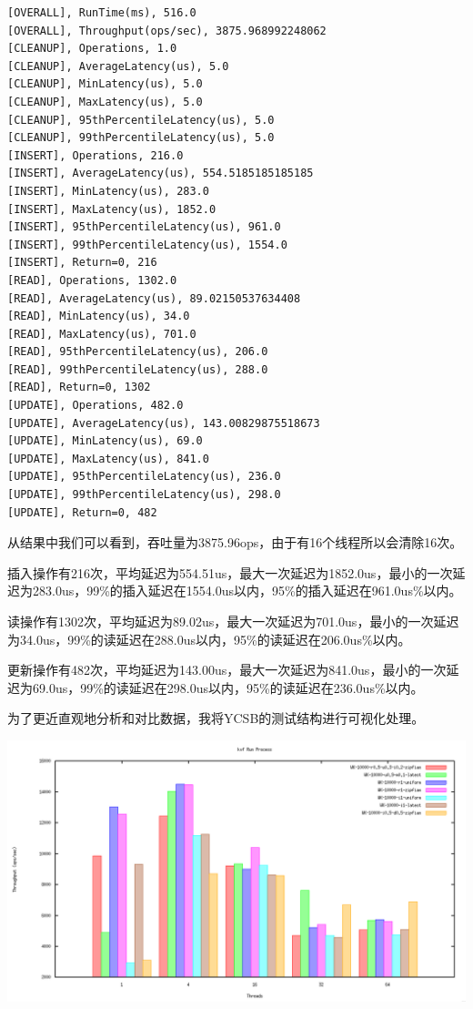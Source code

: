 \begin{Verbatim}[frame = single]
[OVERALL], RunTime(ms), 516.0
[OVERALL], Throughput(ops/sec), 3875.968992248062
[CLEANUP], Operations, 1.0
[CLEANUP], AverageLatency(us), 5.0
[CLEANUP], MinLatency(us), 5.0
[CLEANUP], MaxLatency(us), 5.0
[CLEANUP], 95thPercentileLatency(us), 5.0
[CLEANUP], 99thPercentileLatency(us), 5.0
[INSERT], Operations, 216.0
[INSERT], AverageLatency(us), 554.5185185185185
[INSERT], MinLatency(us), 283.0
[INSERT], MaxLatency(us), 1852.0
[INSERT], 95thPercentileLatency(us), 961.0
[INSERT], 99thPercentileLatency(us), 1554.0
[INSERT], Return=0, 216
[READ], Operations, 1302.0
[READ], AverageLatency(us), 89.02150537634408
[READ], MinLatency(us), 34.0
[READ], MaxLatency(us), 701.0
[READ], 95thPercentileLatency(us), 206.0
[READ], 99thPercentileLatency(us), 288.0
[READ], Return=0, 1302
[UPDATE], Operations, 482.0
[UPDATE], AverageLatency(us), 143.00829875518673
[UPDATE], MinLatency(us), 69.0
[UPDATE], MaxLatency(us), 841.0
[UPDATE], 95thPercentileLatency(us), 236.0
[UPDATE], 99thPercentileLatency(us), 298.0
[UPDATE], Return=0, 482
\end{Verbatim}

	从结果中我们可以看到，吞吐量为3875.96op\/s，由于有16个线程所以会清除16次。

	插入操作有216次，平均延迟为554.51us，最大一次延迟为1852.0us，最小的一次延迟为283.0us，99\%的插入延迟在1554.0us以内，95\%的插入延迟在961.0us\%以内。

	读操作有1302次，平均延迟为89.02us，最大一次延迟为701.0us，最小的一次延迟为34.0us，99\%的读延迟在288.0us以内，95\%的读延迟在206.0us\%以内。


	更新操作有482次，平均延迟为143.00us，最大一次延迟为841.0us，最小的一次延迟为69.0us，99\%的读延迟在298.0us以内，95\%的读延迟在236.0us\%以内。

	为了更近直观地分析和对比数据，我将YCSB的测试结构进行可视化处理。

\begin{center}
	\includegraphics[width=13.9cm]{img/figure14.pdf}
\end{center}

